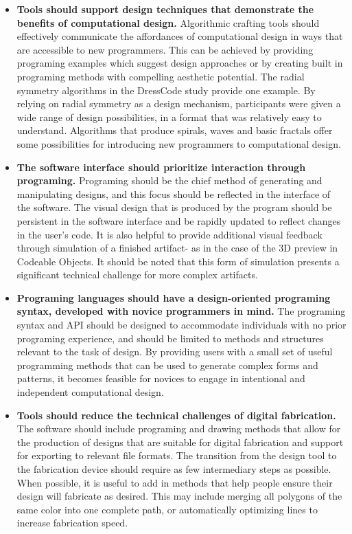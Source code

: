 		\begin{itemize}
		
		\item \textbf{Tools should support design techniques that demonstrate the benefits of computational design.}  Algorithmic crafting tools should effectively communicate the affordances of computational design in ways that are accessible to new programmers. This can be achieved by providing programing examples which suggest design approaches or by creating built in programing methods with compelling aesthetic potential.  The radial symmetry algorithms in the DressCode study provide one example. By relying on radial symmetry as a design mechanism, participants were given  a wide range of design possibilities, in a format that was relatively easy to understand. Algorithms that produce spirals, waves and basic fractals offer some possibilities for introducing new programmers to computational design. 
				
\item \textbf{The software interface should prioritize interaction through programing.} Programing should be the chief method of generating and manipulating designs, and this focus should be reflected in the interface of the software. The visual design that is produced by the program should be persistent in the software interface and be rapidly updated to reflect changes in the user's code. It is also helpful to provide additional visual feedback through simulation of a finished artifact- as in the case of the 3D preview in Codeable Objects. It should be noted that this form of simulation presents a significant technical challenge for more complex artifacts.

\item \textbf{Programing languages should have a design-oriented programing syntax, developed with novice programmers in mind.} The programing syntax and API should be designed to accommodate individuals with no prior programing experience, and should be limited to methods and structures relevant to the task of design. By providing users with a small set of useful programming methods that can be used to generate complex forms and patterns, it becomes feasible for novices to engage in intentional and independent computational design.

\item \textbf {Tools should reduce the technical challenges of digital fabrication.} The software should include programing and drawing methods that allow for the production of designs that are suitable for digital fabrication and support for exporting to relevant file formats. The transition from the design tool to the fabrication device should require as few intermediary steps as possible. When possible, it is useful to add in methods that help people ensure their design will fabricate as desired. This may include merging all polygons of the same color into one complete path, or automatically optimizing lines to increase fabrication speed. 


\end{itemize}
